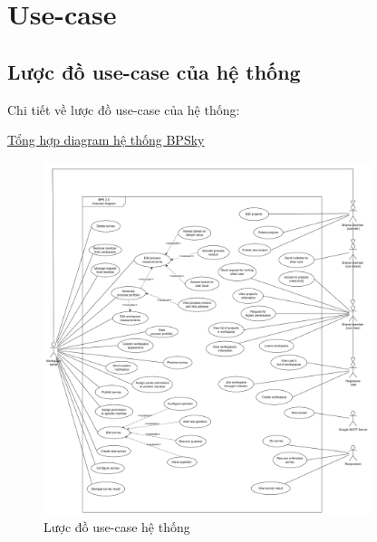 \section{Use-case}
\subsection{Lược đồ use-case của hệ thống}

Chi tiết về lược đồ use-case của hệ thống:

\href{https://app.diagrams.net/#G1Myz6UnduM7vZYhCvuX0KpLPWf_OdprEM#%7B%22pageId%22%3A%22aGwoCCFz17a1391KKWEK%22%7D}{Tổng hợp diagram hệ thống BPSky}

\begin{figure}[H]
    \begin{center}
        \includegraphics[width=0.85\textwidth]{Content/Phân tích và thiết kế hệ thống/documents/Use case/images/System usecase - HK232.png}
        \vspace{0.5cm}
        \caption{Lược đồ use-case hệ thống}
        \label{fig: Lược đồ use-case hệ thống}
    \end{center}
\end{figure}


% 

% 

